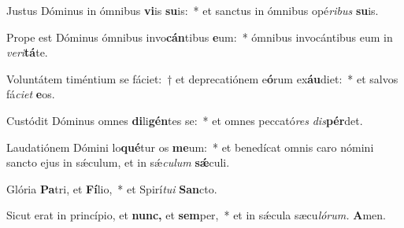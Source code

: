 \item Justus Dóminus in ómnibus \textbf{vi}is \textbf{su}is:~* et sanctus in ómnibus opé\textit{ribus} \textbf{su}is.
\item Prope est Dóminus ómnibus invo\textbf{cán}tibus \textbf{e}um:~* ómnibus invocántibus eum in \textit{veri}\textbf{tá}te.
\item Voluntátem timéntium se fáciet:~† et deprecatiónem e\textbf{ó}rum ex\textbf{áu}diet:~* et salvos fá\tinyhspace\textit{ciet} \textbf{e}os.
\item Custódit Dóminus omnes \textbf{di}li\textbf{gén}tes se:~* et omnes peccató\textit{res} \textit{dis}\textbf{pér}det.
\item Laudatiónem Dómini lo\textbf{qué}tur os \textbf{me}um:~* et benedícat omnis caro nómini sancto ejus in sǽculum, et in sǽ\tinyhspace\textit{culum} \textbf{sǽ}culi.
\item Glória \textbf{Pa}tri, et \textbf{Fí}lio,~* et Spirí\tinyhspace\textit{tui} \textbf{San}cto.
\item Sicut erat in princípio, et \textbf{nunc,} et \textbf{sem}per,~* et in sǽcula sæcu\tinyhspace\textit{lórum.} \textbf{A}men.